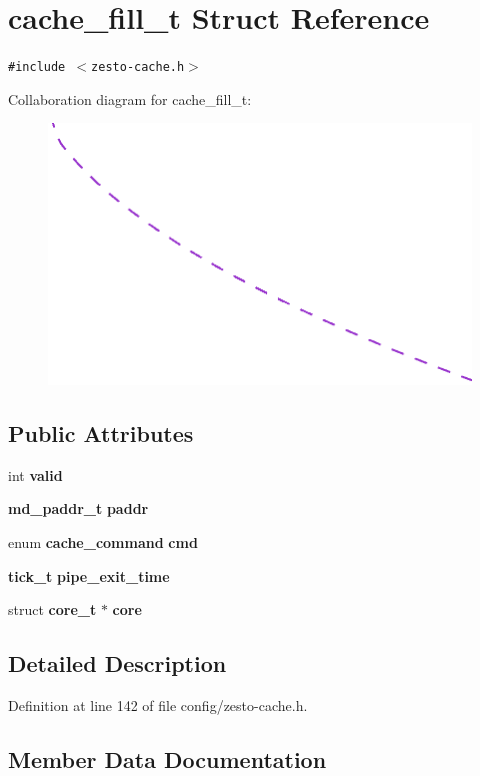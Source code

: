 \section{cache\_\-fill\_\-t Struct Reference}
\label{structcache__fill__t}
{\tt \#include $<$zesto-cache.h$>$}

Collaboration diagram for cache\_\-fill\_\-t:\nopagebreak
\begin{figure}[H]
\begin{center}
\leavevmode
\includegraphics[width=400pt]{structcache__fill__t__coll__graph}
\end{center}
\end{figure}
\subsection*{Public Attributes}
\begin{CompactItemize}
\item 
int {\bf valid}
\item 
{\bf md\_\-paddr\_\-t} {\bf paddr}
\item 
enum {\bf cache\_\-command} {\bf cmd}
\item 
{\bf tick\_\-t} {\bf pipe\_\-exit\_\-time}
\item 
struct {\bf core\_\-t} $\ast$ {\bf core}
\end{CompactItemize}


\subsection{Detailed Description}


Definition at line 142 of file config/zesto-cache.h.

\subsection{Member Data Documentation}
